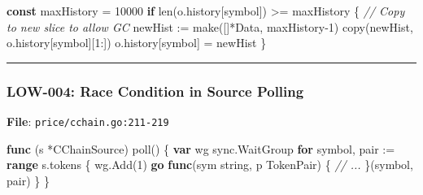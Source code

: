\documentclass[
]{article}
\newenvironment{Shaded}{}{}
\newcommand{\BuiltInTok}[1]{\textcolor[rgb]{0.00,0.50,0.00}{#1}}
\newcommand{\CommentTok}[1]{\textcolor[rgb]{0.38,0.63,0.69}{\textit{#1}}}
\newcommand{\ControlFlowTok}[1]{\textcolor[rgb]{0.00,0.44,0.13}{\textbf{#1}}}
\newcommand{\DataTypeTok}[1]{\textcolor[rgb]{0.56,0.13,0.00}{#1}}
\newcommand{\DecValTok}[1]{\textcolor[rgb]{0.25,0.63,0.44}{#1}}
\newcommand{\KeywordTok}[1]{\textcolor[rgb]{0.00,0.44,0.13}{\textbf{#1}}}
\newcommand{\NormalTok}[1]{#1}
\newcommand{\OperatorTok}[1]{\textcolor[rgb]{0.40,0.40,0.40}{#1}}
\begin{document}
\begin{Shaded}
\begin{Highlighting}[]
\KeywordTok{const}\NormalTok{ maxHistory }\OperatorTok{=} \DecValTok{10000}
\ControlFlowTok{if} \BuiltInTok{len}\OperatorTok{(}\NormalTok{o}\OperatorTok{.}\NormalTok{history}\OperatorTok{[}\NormalTok{symbol}\OperatorTok{])} \OperatorTok{\textgreater{}=}\NormalTok{ maxHistory }\OperatorTok{\{}
    \CommentTok{// Copy to new slice to allow GC}
\NormalTok{    newHist }\OperatorTok{:=} \BuiltInTok{make}\OperatorTok{([]*}\NormalTok{Data}\OperatorTok{,}\NormalTok{ maxHistory}\OperatorTok{{-}}\DecValTok{1}\OperatorTok{)}
    \BuiltInTok{copy}\OperatorTok{(}\NormalTok{newHist}\OperatorTok{,}\NormalTok{ o}\OperatorTok{.}\NormalTok{history}\OperatorTok{[}\NormalTok{symbol}\OperatorTok{][}\DecValTok{1}\OperatorTok{:])}
\NormalTok{    o}\OperatorTok{.}\NormalTok{history}\OperatorTok{[}\NormalTok{symbol}\OperatorTok{]} \OperatorTok{=}\NormalTok{ newHist}
\OperatorTok{\}}
\end{Highlighting}
\end{Shaded}

\begin{center}\rule{0.5\linewidth}{0.5pt}\end{center}

\subsubsection{LOW-004: Race Condition in Source
Polling}\label{low-004-race-condition-in-source-polling}

\textbf{File}: \texttt{price/cchain.go:211-219}

\begin{Shaded}
\begin{Highlighting}[]
\KeywordTok{func} \OperatorTok{(}\NormalTok{s }\OperatorTok{*}\NormalTok{CChainSource}\OperatorTok{)}\NormalTok{ poll}\OperatorTok{()} \OperatorTok{\{}
    \KeywordTok{var}\NormalTok{ wg sync}\OperatorTok{.}\NormalTok{WaitGroup}
    \ControlFlowTok{for}\NormalTok{ symbol}\OperatorTok{,}\NormalTok{ pair }\OperatorTok{:=} \KeywordTok{range}\NormalTok{ s}\OperatorTok{.}\NormalTok{tokens }\OperatorTok{\{}
\NormalTok{        wg}\OperatorTok{.}\NormalTok{Add}\OperatorTok{(}\DecValTok{1}\OperatorTok{)}
        \ControlFlowTok{go} \KeywordTok{func}\OperatorTok{(}\NormalTok{sym }\DataTypeTok{string}\OperatorTok{,}\NormalTok{ p TokenPair}\OperatorTok{)} \OperatorTok{\{}
            \CommentTok{// ...}
        \OperatorTok{\}(}\NormalTok{symbol}\OperatorTok{,}\NormalTok{ pair}\OperatorTok{)}
    \OperatorTok{\}}
\OperatorTok{\}}
\end{Highlighting}
\end{Shaded}
\end{document}
